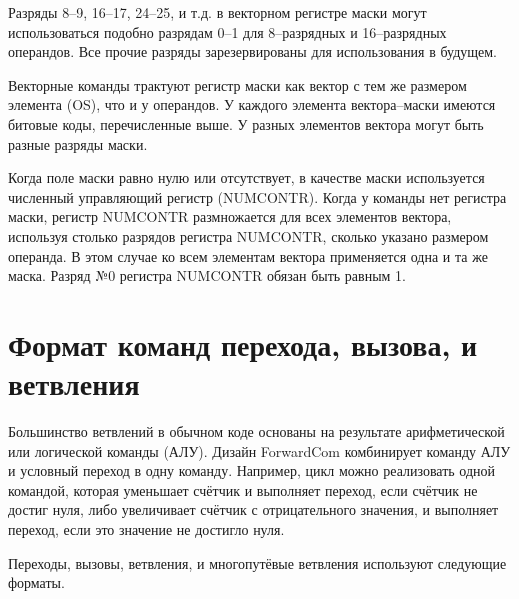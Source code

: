 \documentclass[forwardcom.tex]{subfiles}
\begin{document}
Разряды 8--9, 16--17, 24--25, и т.д. в векторном регистре маски могут использоваться подобно разрядам 0--1 для 8--разрядных и 16--разрядных операндов. Все прочие разряды зарезервированы для использования в будущем.

Векторные команды трактуют регистр маски как вектор с тем же размером элемента (OS), что и у операндов. У каждого элемента вектора--маски имеются битовые коды, перечисленные выше. У разных элементов вектора могут быть разные разряды маски.

Когда поле маски равно нулю или отсутствует, в качестве маски используется численный управляющий регистр (NUMCONTR). Когда у команды нет регистра маски, регистр NUMCONTR размножается для всех элементов вектора, используя столько разрядов регистра NUMCONTR, сколько указано размером операнда. В этом случае ко всем элементам вектора применяется одна и та же маска. Разряд №0 регистра NUMCONTR обязан быть равным 1.

\section{Формат команд перехода, вызова, и ветвления}
Большинство ветвлений в обычном коде основаны на результате арифметической или логической команды (АЛУ). Дизайн ForwardCom комбинирует команду АЛУ и условный переход в одну команду. Например, цикл можно реализовать одной командой, которая уменьшает счётчик и выполняет переход, если счётчик не достиг нуля, либо увеличивает счётчик с отрицательного значения, и выполняет переход, если это значение не достигло нуля.

Переходы, вызовы, ветвления, и многопутёвые ветвления используют следующие форматы.
\end{document}
